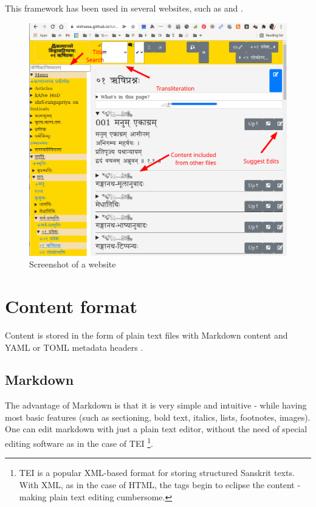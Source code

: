\documentclass[11pt]{article}
\begin{document}
This framework has been used in several websites, such as \cite{vishvAsa_kalpAntaram} and \cite{vishvAsa_bhAShAntaram}.


\begin{figure}[h]
\caption{Screenshot of a website}
\centering
\includegraphics[width=1.0\textwidth]{images/kalpAntaram-screenshot}
\end{figure}


\section{Content format}
Content is stored in the form of plain text files with Markdown content \cite{commonmark} and YAML or TOML metadata headers \cite{toml}. 

\subsection{Markdown}
The advantage of Markdown is that it is very simple and intuitive - while having most basic features (such as sectioning, bold text, italics, lists, footnotes, images). One can edit markdown with just a plain text editor, without the need of special editing software as in the case of TEI \footnote{TEI is a popular XML-based format for storing structured Sanskrit texts. With XML, as in the case of HTML, the tags begin to eclipse the content - making plain text editing cumbersome.}. 
\end{document}
